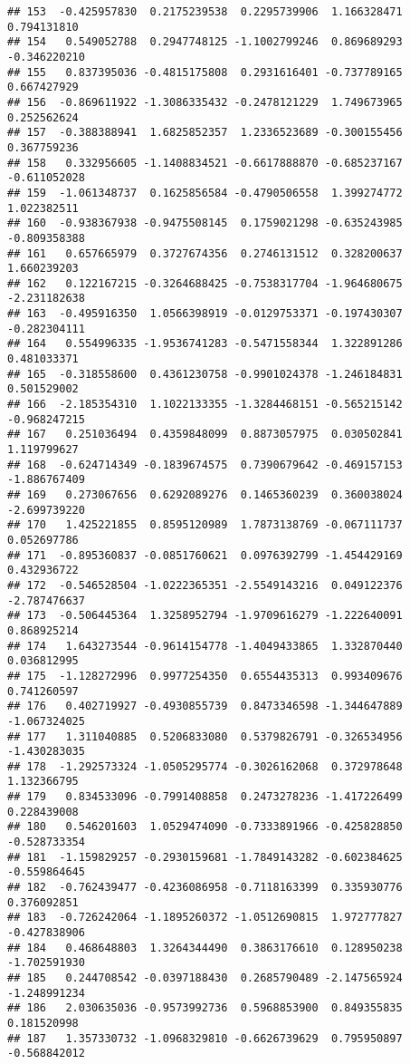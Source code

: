 \documentclass[
]{article}
\begin{document}
\begin{verbatim}
## 153  -0.425957830  0.2175239538  0.2295739906  1.166328471  0.794131810
## 154   0.549052788  0.2947748125 -1.1002799246  0.869689293 -0.346220210
## 155   0.837395036 -0.4815175808  0.2931616401 -0.737789165  0.667427929
## 156  -0.869611922 -1.3086335432 -0.2478121229  1.749673965  0.252562624
## 157  -0.388388941  1.6825852357  1.2336523689 -0.300155456  0.367759236
## 158   0.332956605 -1.1408834521 -0.6617888870 -0.685237167 -0.611052028
## 159  -1.061348737  0.1625856584 -0.4790506558  1.399274772  1.022382511
## 160  -0.938367938 -0.9475508145  0.1759021298 -0.635243985 -0.809358388
## 161   0.657665979  0.3727674356  0.2746131512  0.328200637  1.660239203
## 162   0.122167215 -0.3264688425 -0.7538317704 -1.964680675 -2.231182638
## 163  -0.495916350  1.0566398919 -0.0129753371 -0.197430307 -0.282304111
## 164   0.554996335 -1.9536741283 -0.5471558344  1.322891286  0.481033371
## 165  -0.318558600  0.4361230758 -0.9901024378 -1.246184831  0.501529002
## 166  -2.185354310  1.1022133355 -1.3284468151 -0.565215142 -0.968247215
## 167   0.251036494  0.4359848099  0.8873057975  0.030502841  1.119799627
## 168  -0.624714349 -0.1839674575  0.7390679642 -0.469157153 -1.886767409
## 169   0.273067656  0.6292089276  0.1465360239  0.360038024 -2.699739220
## 170   1.425221855  0.8595120989  1.7873138769 -0.067111737  0.052697786
## 171  -0.895360837 -0.0851760621  0.0976392799 -1.454429169  0.432936722
## 172  -0.546528504 -1.0222365351 -2.5549143216  0.049122376 -2.787476637
## 173  -0.506445364  1.3258952794 -1.9709616279 -1.222640091  0.868925214
## 174   1.643273544 -0.9614154778 -1.4049433865  1.332870440  0.036812995
## 175  -1.128272996  0.9977254350  0.6554435313  0.993409676  0.741260597
## 176   0.402719927 -0.4930855739  0.8473346598 -1.344647889 -1.067324025
## 177   1.311040885  0.5206833080  0.5379826791 -0.326534956 -1.430283035
## 178  -1.292573324 -1.0505295774 -0.3026162068  0.372978648  1.132366795
## 179   0.834533096 -0.7991408858  0.2473278236 -1.417226499  0.228439008
## 180   0.546201603  1.0529474090 -0.7333891966 -0.425828850 -0.528733354
## 181  -1.159829257 -0.2930159681 -1.7849143282 -0.602384625 -0.559864645
## 182  -0.762439477 -0.4236086958 -0.7118163399  0.335930776  0.376092851
## 183  -0.726242064 -1.1895260372 -1.0512690815  1.972777827 -0.427838906
## 184   0.468648803  1.3264344490  0.3863176610  0.128950238 -1.702591930
## 185   0.244708542 -0.0397188430  0.2685790489 -2.147565924 -1.248991234
## 186   2.030635036 -0.9573992736  0.5968853900  0.849355835  0.181520998
## 187   1.357330732 -1.0968329810 -0.6626739629  0.795950897 -0.568842012

\end{verbatim}
\end{document}

